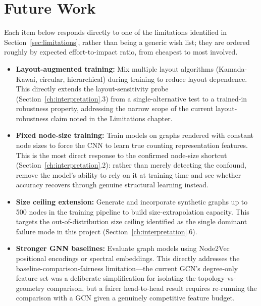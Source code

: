 \documentclass[11pt,letterpaper]{article}
\numberwithin{equation}{section}
\numberwithin{figure}{section}
\numberwithin{table}{section}
\begin{document}
\section{Future Work}
\label{sec:futurework}
Each item below responds directly to one of the limitations identified in Section~\ref{sec:limitations}, rather than being a generic wish list; they are ordered roughly by expected effort-to-impact ratio, from cheapest to most involved.
\begin{itemize}
    \item \textbf{Layout-augmented training:} Mix multiple layout algorithms (Kamada-Kawai, circular, hierarchical) during training to reduce layout dependence. This directly extends the layout-sensitivity probe (Section~\ref{ch:interpretation}.3) from a single-alternative test to a trained-in robustness property, addressing the narrow scope of the current layout-robustness claim noted in the Limitations chapter.
    \item \textbf{Fixed node-size training:} Train models on graphs rendered with constant node sizes to force the CNN to learn true counting representation features. This is the most direct response to the confirmed node-size shortcut (Section~\ref{ch:interpretation}.2): rather than merely detecting the confound, remove the model's ability to rely on it at training time and see whether accuracy recovers through genuine structural learning instead.
    \item \textbf{Size ceiling extension:} Generate and incorporate synthetic graphs up to 500 nodes in the training pipeline to build size-extrapolation capacity. This targets the out-of-distribution size ceiling identified as the single dominant failure mode in this project (Section~\ref{ch:interpretation}.6).
    \item \textbf{Stronger GNN baselines:} Evaluate graph models using Node2Vec positional encodings or spectral embeddings. This directly addresses the baseline-comparison-fairness limitation---the current GCN's degree-only feature set was a deliberate simplification for isolating the topology-vs-geometry comparison, but a fairer head-to-head result requires re-running the comparison with a GCN given a genuinely competitive feature budget.
\end{itemize}

\end{document}
